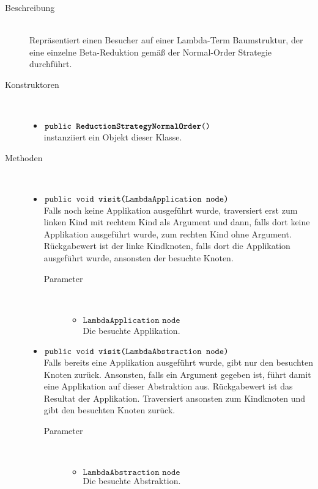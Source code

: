 \begin{description}
\item[Beschreibung] \hfill \\ Repräsentiert einen Besucher auf einer Lambda-Term Baumstruktur, der eine einzelne Beta-Reduktion gemäß der Normal-Order Strategie durchführt.

\item[Konstruktoren] \hfill \\
	\vspace{-.8cm}
	\begin{itemize}
		\item $\texttt{public \textbf{ReductionStrategyNormalOrder}()}$ \\ instanziiert ein Objekt dieser Klasse.
	\end{itemize}

\item[Methoden] \hfill \\
	\vspace{-.8cm}
	\begin{itemize}
		\item $\texttt{public void \textbf{visit}(LambdaApplication node)}$ \\ Falls noch keine Applikation ausgeführt wurde, traversiert erst zum linken Kind mit rechtem Kind als Argument und dann, falls dort keine Applikation ausgeführt wurde, zum rechten Kind ohne Argument. Rückgabewert ist der linke Kindknoten, falls dort die Applikation ausgeführt wurde, ansonsten der besuchte Knoten.
		\begin{description}
			\item[Parameter] \hfill \\
			\vspace{-.8cm}
			\begin{itemize}
				\item $\texttt{LambdaApplication node}$ \\ Die besuchte Applikation.
			\end{itemize}
		\end{description}
		
		\item $\texttt{public void \textbf{visit}(LambdaAbstraction node)}$ \\ Falls bereits eine Applikation ausgeführt wurde, gibt nur den besuchten Knoten zurück. Ansonsten, falls ein Argument gegeben ist, führt damit eine Applikation auf dieser Abstraktion aus. Rückgabewert ist das Resultat der Applikation. Traversiert ansonsten zum Kindknoten und gibt den besuchten Knoten zurück.
		\begin{description}
			\item[Parameter] \hfill \\
			\vspace{-.8cm}
			\begin{itemize}
				\item $\texttt{LambdaAbstraction node}$ \\ Die besuchte Abstraktion.
			\end{itemize}
		\end{description}
	\end{itemize}
\end{description}

